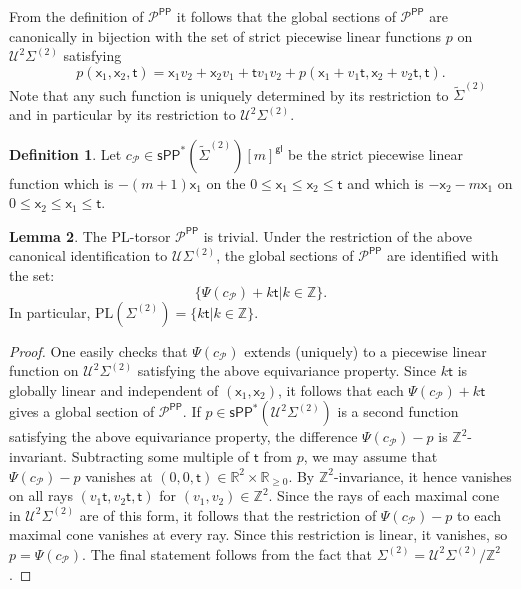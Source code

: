 \documentclass[11pt]{article}
\def\PL{\mathrm{PL}}
\newcommand{\sfpp}{\mathsf{PP}}
\newcommand{\sPP}{\mathsf{sPP}}
\newcommand{\spp}{\sPP}
\theoremstyle{definition}
\newtheorem{definition}{Definition}[section]
\newtheorem{lemma}[definition]{Lemma}
\begin{document}
From the definition of $\mathcal{P}^{\sfpp}$ it follows that the global sections of $\mathcal{P}^{\sfpp}$
are canonically in bijection with the set of strict piecewise linear functions $p$ on $\mathcal U^2\Sigma^{(2)}$ satisfying
$$p(\mathsf{x}_1,\mathsf{x}_2,\mathsf{t})=\mathsf{x}_1v_2+\mathsf{x}_2v_1+\mathsf{t}v_1v_2+p(\mathsf{x}_1+v_1\mathsf{t},\mathsf{x}_2+v_2\mathsf{t},\mathsf{t}).$$
Note that any such function is uniquely determined by its restriction to $\tilde{\Sigma}^{(2)}$ and in particular
by its restriction to $\mathcal U^2\Sigma^{(2)}$.

\begin{definition}
    Let $c_{\mathcal P}\in\spp^{\ast}(\tilde{\Sigma}^{(2)})[m]^{\mathsf{gl}}$ be the strict piecewise linear function which is
    $-(m+1)\mathsf{x}_1$ on the $0\le \mathsf{x}_1\le \mathsf{x}_{2}\le \mathsf{t}$ and which is $-\mathsf{x}_2-m\mathsf{x}_1$ on $0\le \mathsf{x}_2\le \mathsf{x}_1\le \mathsf{t}$.
\end{definition}

\begin{lemma}\label{lem:P_trop_triv}
	The $\PL$-torsor $\mathcal{P}^{\sfpp}$ is trivial. Under the restriction of the above canonical identification
	to $\mathcal U\Sigma^{(2)}$, the global sections of $\mathcal{P}^{\sfpp}$ are identified with the set:
	$$\{\Psi(c_{\mathcal P})+k\mathsf{t}|k\in \mathbb{Z}\}.$$
	In particular, $\PL(\Sigma^{(2)})=\{k\mathsf{t}|k\in \mathbb{Z}\}$.
\end{lemma}

\begin{proof}
	One easily checks that $\Psi(c_{\mathcal P})$ extends (uniquely) to a piecewise linear function on $\mathcal U^2\Sigma^{(2)}$
	satisfying the above equivariance property. Since $k\mathsf{t}$ is globally linear and independent of $(\mathsf{x}_1,\mathsf{x}_2)$, it follows that
	each $\Psi(c_{\mathcal P})+k\mathsf{t}$ gives a global section of $\mathcal{P}^{\sfpp}$. If $p\in \spp^{\ast}(\mathcal U^2\Sigma^{(2)})$
	is a second function satisfying the above equivariance property, the difference $\Psi(c_{\mathcal P})-p$
	is $\mathbb{Z}^{2}$-invariant. Subtracting some multiple of $\mathsf{t}$ from $p$, we may assume that $\Psi(c_{\mathcal P})-p$ vanishes
	at $(0,0,\mathsf{t})\in \mathbb{R}^{2}\times\mathbb{R}_{\ge 0}$. By $\mathbb{Z}^{2}$-invariance, it hence vanishes on all rays
	$(v_1\mathsf{t},v_2\mathsf{t},\mathsf{t})$ for $(v_1,v_2)\in \mathbb{Z}^{2}$. Since the rays of each maximal cone in $\mathcal U^2\Sigma^{(2)}$
	are of this form, it follows that the restriction of $\Psi(c_{\mathcal{P}})-p$ to each maximal cone vanishes at every ray. Since this restriction
	is linear, it vanishes, so $p=\Psi(c_{\mathcal P})$. The final statement follows from the fact that $\Sigma^{(2)}=\mathcal U^2\Sigma^{(2)}/\mathbb{Z}^{2}$.
\end{proof}
\end{document}

